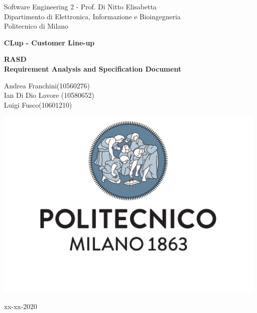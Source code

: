 \documentclass[a4paper]{article}
\begin{document}
\begin{titlepage}
	\centering
    
    {\normalsize 
        Software Engineering 2 - Prof. Di Nitto Elisabetta \\ 
		Dipartimento di Elettronica, Informazione e Bioingegneria \\
        Politecnico di Milano \par
    }     \vspace{3cm}

    {\Huge \textbf{CLup - Customer Line-up\\} }    \vspace{1cm}
  
    {\large \textbf{RASD\\Requirement Analysis and Specification Document} \par}     \vspace{4cm}

	{\normalsize Andrea Franchini(10560276) \\ Ian Di Dio Lavore (10580652)\\ Luigi Fusco(10601210)\par}     \vspace{3cm}

    \includegraphics[scale=0.4]{images/logo.pdf}     \vspace{0.5cm}

	{\normalsize xx-xx-2020 \par}
	
\end{titlepage}

\listoftodos

\tableofcontents

    
    
    

    

    

    
\end{document}
